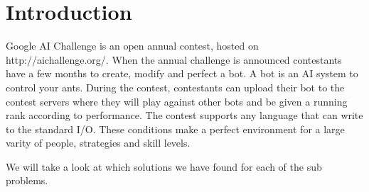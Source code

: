 \section{Introduction}

Google AI Challenge is an open annual contest, hosted on http://aichallenge.org/. When the annual challenge is announced contestants have a few months to create, modify and perfect a bot. A bot is an AI system to control your ants. During the contest, contestants can upload their bot to the contest servers where they will play against other bots and be given a running rank according to performance. The contest supports any language that can write to the standard I/O. These conditions make a perfect environment for a large varity of people, strategies and skill levels.

We will take a look at which solutions we have found for each of the sub problems. 
